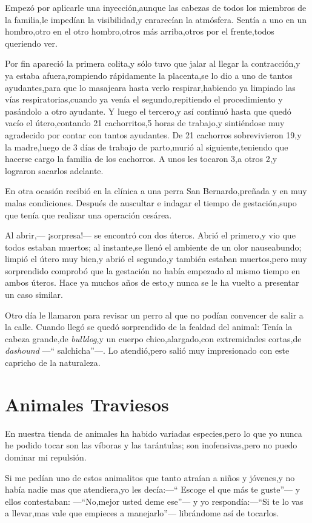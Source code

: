 \documentclass[letterpaper,12pt]{book}
\begin{document}
Empezó por aplicarle una inyección,aunque las cabezas de todos los miembros de la familia,le impedían la visibilidad,y enrarecían la atmósfera. Sentía a uno en un hombro,otro en el otro hombro,otros más arriba,otros por el frente,todos queriendo ver.

Por fin apareció la primera colita,y sólo tuvo que jalar al llegar la contracción,y ya estaba afuera,rompiendo rápidamente la placenta,se lo dio a uno de tantos ayudantes,para que lo masajeara hasta verlo respirar,habiendo ya limpiado las vías respiratorias,cuando ya venía el segundo,repitiendo el procedimiento y pasándolo a otro ayudante. Y luego el tercero,y así continuó hasta que quedó vacío el útero,contando 21 cachorritos,5 horas de trabajo,y sintiéndose muy agradecido por contar con tantos ayudantes. De 21 cachorros sobrevivieron 19,y la madre,luego de 3 días de trabajo de parto,murió al siguiente,teniendo que hacerse cargo la familia de los cachorros. A unos les tocaron 3,a otros 2,y lograron sacarlos adelante.

En otra ocasión recibió en la clínica a una perra San Bernardo,preñada y en muy malas condiciones. Después de auscultar e indagar el tiempo de gestación,supo que tenía que realizar una operación cesárea.

Al abrir,--- ¡sorpresa!--- se encontró con dos úteros. Abrió el primero,y vio que todos estaban muertos; al instante,se llenó el ambiente de un olor nauseabundo; limpió el útero muy bien,y abrió el segundo,y también estaban muertos,pero muy sorprendido comprobó que la gestación no había empezado al mismo tiempo en ambos úteros. Hace ya muchos años de esto,y nunca se le ha vuelto a presentar un caso similar.

Otro día le llamaron para revisar un perro al que no podían convencer de salir a la calle. Cuando llegó se quedó sorprendido de la fealdad del animal: Tenía la cabeza grande,de {\it bulldog},y un cuerpo chico,alargado,con extremidades cortas,de {\it dashound} ---`` salchicha''---. Lo atendió,pero salió muy impresionado con este capricho de la naturaleza.
\chapter{Animales Traviesos}
En nuestra tienda de animales ha habido variadas especies,pero lo que yo nunca he podido tocar son las víboras y las tarántulas; son inofensivas,pero no puedo dominar mi repulsión.

Si me pedían uno de estos animalitos que tanto atraían a niños y jóvenes,y no había nadie mas que atendiera,yo les decía:---`` Escoge el que más te guste''--- y ellos contestaban: ---``No,mejor usted deme ese''--- y yo respondía:---``Si te lo vas a llevar,mas vale que empieces a manejarlo''--- librándome así de tocarlos.
\end{document}
